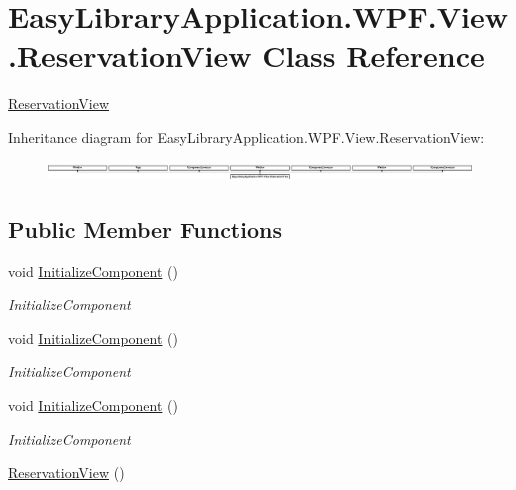 \hypertarget{class_easy_library_application_1_1_w_p_f_1_1_view_1_1_reservation_view}{}\section{Easy\+Library\+Application.\+W\+P\+F.\+View.\+Reservation\+View Class Reference}
\label{class_easy_library_application_1_1_w_p_f_1_1_view_1_1_reservation_view}


\mbox{\hyperlink{class_easy_library_application_1_1_w_p_f_1_1_view_1_1_reservation_view}{Reservation\+View}}  


Inheritance diagram for Easy\+Library\+Application.\+W\+P\+F.\+View.\+Reservation\+View\+:\begin{figure}[H]
\begin{center}
\leavevmode
\includegraphics[height=0.509554cm]{class_easy_library_application_1_1_w_p_f_1_1_view_1_1_reservation_view}
\end{center}
\end{figure}
\subsection*{Public Member Functions}
\begin{DoxyCompactItemize}
\item 
void \mbox{\hyperlink{class_easy_library_application_1_1_w_p_f_1_1_view_1_1_reservation_view_a3832f82e8e26e995ffb20a54a586b501}{Initialize\+Component}} ()
\begin{DoxyCompactList}\small\item\em Initialize\+Component \end{DoxyCompactList}\item 
void \mbox{\hyperlink{class_easy_library_application_1_1_w_p_f_1_1_view_1_1_reservation_view_a3832f82e8e26e995ffb20a54a586b501}{Initialize\+Component}} ()
\begin{DoxyCompactList}\small\item\em Initialize\+Component \end{DoxyCompactList}\item 
void \mbox{\hyperlink{class_easy_library_application_1_1_w_p_f_1_1_view_1_1_reservation_view_a3832f82e8e26e995ffb20a54a586b501}{Initialize\+Component}} ()
\begin{DoxyCompactList}\small\item\em Initialize\+Component \end{DoxyCompactList}\item 
\mbox{\hyperlink{class_easy_library_application_1_1_w_p_f_1_1_view_1_1_reservation_view_a5ca76fcfb631530b80411fc631c2a519}{Reservation\+View}} ()
\end{DoxyCompactItemize}


